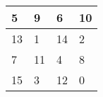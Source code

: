 \begin{tabular}{|l|l|l|l|}
\hline
5&9&6&10\\\hline
13&1&14&2\\\hline
7&11&4&8\\\hline
15&3&12&0\\\hline
\end{tabular}
